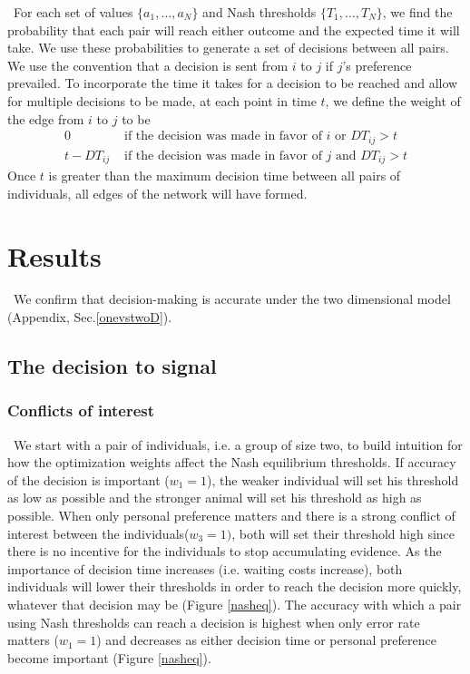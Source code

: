 \documentclass{article}
\begin{document}
\ For each set of values $\{a_1,\dots,a_N\}$ and Nash thresholds $\{T_1,\dots,T_N\}$, we find the probability that each pair will reach either outcome and the expected time it will take.  We use these probabilities to generate a set of decisions between all pairs.  We use the convention that a decision is sent from $i$ to $j$ if $j$'s preference prevailed.  To incorporate the time it takes for a decision to be reached and allow for multiple decisions to be made, at each point in time $t$, we define the weight of the edge from $i$ to $j$ to be
$$
\begin{array}{lllll}
0 & \text{ if the decision was made in favor of } i\text{ or } DT_{ij}>t 
\\t-DT_{ij} & \text{ if the decision was made in favor of } j\text{ and } DT_{ij}>t 
\end{array}
$$
Once $t$ is greater than the maximum decision time between all pairs of individuals, all edges of the network will have formed.

\section*{Results }
\ We confirm that decision-making is accurate under the two dimensional model (Appendix, Sec.\ref{onevstwoD}).

\subsection*{The decision to signal }
\subsubsection*{Conflicts of interest}
\ We start with a pair of individuals, i.e. a group of size two, to build intuition for how the optimization weights affect the Nash equilibrium thresholds.  If accuracy of the decision is important ($w_1=1$), the weaker individual will set his threshold as low as possible and the stronger animal will set his threshold as high as possible. When only personal preference matters and there is a strong conflict of interest between the individuals($w_3=1)$, both will set their threshold high since there is no incentive for the individuals to stop accumulating evidence. As the importance of decision time increases (i.e. waiting costs increase), both individuals will lower their thresholds in order to reach the decision more quickly, whatever that decision may be (Figure \ref{nasheq}). The accuracy with which a pair using Nash thresholds can reach a decision is highest when only error rate matters ($w_1=1$) and decreases as either decision time or personal preference become important (Figure \ref{nasheq}).  
\end{document}

